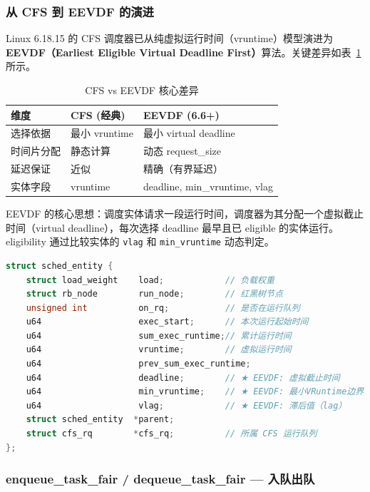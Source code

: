 \documentclass[a4paper]{article}
\newcommand{\tabref}[1]{表~\ref{#1}}
\begin{document}
\subsubsection{从 CFS 到 EEVDF 的演进}

Linux 6.18.15 的 CFS 调度器已从纯虚拟运行时间（vruntime）模型演进为\textbf{EEVDF（Earliest Eligible Virtual Deadline First）}算法\cite{sched_eevdf,lwn_eevdf,eevdf_paper}。关键差异如\tabref{tab:cfs_eevdf}所示。

\begin{table}[htbp]
\centering
\caption{CFS vs EEVDF 核心差异}
\label{tab:cfs_eevdf}
\begin{tabular}{lll}
\toprule
\textbf{维度} & \textbf{CFS (经典)} & \textbf{EEVDF (6.6+)} \\
\midrule
选择依据 & 最小 vruntime & 最小 virtual deadline \\
时间片分配 & 静态计算 & 动态 request\_size \\
延迟保证 & 近似 & 精确（有界延迟） \\
实体字段 & vruntime & deadline, min\_vruntime, vlag \\
\bottomrule
\end{tabular}
\end{table}

EEVDF 的核心思想：调度实体请求一段运行时间，调度器为其分配一个虚拟截止时间（virtual deadline），每次选择 deadline 最早且已 eligible 的实体运行。eligibility 通过比较实体的 \texttt{vlag} 和 \texttt{min\_vruntime} 动态判定。

\begin{lstlisting}[language=C, caption={sched\_entity — EEVDF 核心字段（include/linux/sched.h）}, label={lst:se_eevdf}]
struct sched_entity {
    struct load_weight    load;            // 负载权重
    struct rb_node        run_node;        // 红黑树节点
    unsigned int          on_rq;           // 是否在运行队列
    u64                   exec_start;      // 本次运行起始时间
    u64                   sum_exec_runtime;// 累计运行时间
    u64                   vruntime;        // 虚拟运行时间
    u64                   prev_sum_exec_runtime;
    u64                   deadline;        // ★ EEVDF: 虚拟截止时间
    u64                   min_vruntime;    // ★ EEVDF: 最小VRuntime边界
    u64                   vlag;            // ★ EEVDF: 滞后值（lag）
    struct sched_entity  *parent;
    struct cfs_rq        *cfs_rq;          // 所属 CFS 运行队列
};
\end{lstlisting}

\subsubsection{enqueue\_task\_fair / dequeue\_task\_fair — 入队出队}
\end{document}

